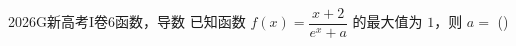 
\begin{problem}{2026}{G}{新高考I卷}{6}{函数，导数}
已知函数 $ f(x)=\dfrac{x+2}{e^x+a} $ 的最大值为 $ 1 $，则 $ a= $ (\hspace{1cm})
\begin{choices}
\end{choices}
\end{problem}

\begin{answer}
\end{answer}

\begin{solutions}
\end{solutions}